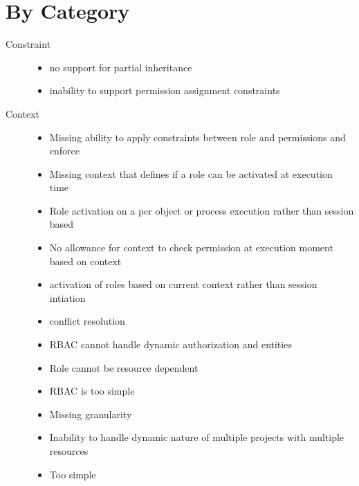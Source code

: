\documentclass[letterpaper,10pt,english]{sphinxmanual}
\begin{document}
\section{By Category}
\label{research_questions/RQ_1:by-category}\begin{description}
\item[{Constraint}] \leavevmode\begin{itemize}
\item {} 
no support for partial inheritance

\item {} 
inability to support permission assignment constraints

\end{itemize}

\item[{Context}] \leavevmode\begin{itemize}
\item {} 
Missing ability to apply constraints between role and permissions and enforce

\item {} 
Missing context that defines if a role can be activated at execution time

\item {} 
Role activation on a per object or process execution rather than session based

\item {} 
No allowance for context to check permission at execution moment based on context

\item {} 
activation of roles based on current context rather than session intiation

\item {} 
conflict resolution

\item {} 
RBAC cannot handle dynamic authorization and entities

\item {} 
Role cannot be resource dependent

\item {} 
RBAC is too simple

\item {} 
Missing granularity

\item {} 
Inability to handle dynamic nature of multiple projects with multiple resources

\item {} 
Too simple


\end{itemize}
\end{description}
\end{document}
